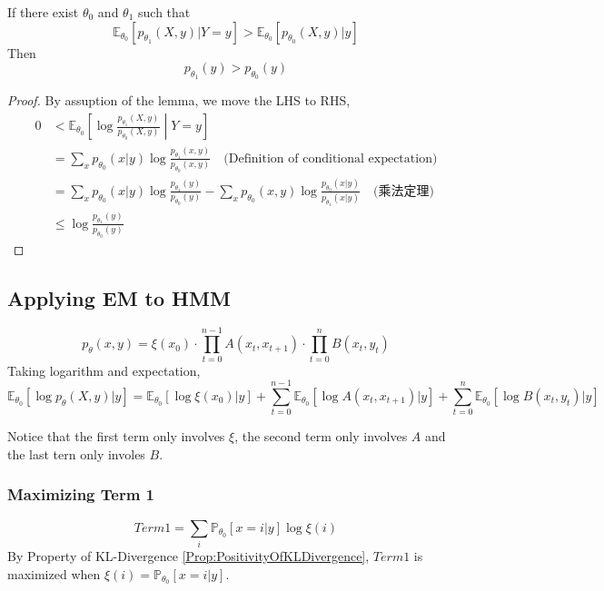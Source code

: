         \begin{lemma}\label{Lem:IncreasingLowerBoundOfEMAlgo}
            If there exist $\theta_0$ and $\theta_1$ such that
            \[ \mathbb{E}_{\theta_0}[p_{\theta_1}(X,y)|Y=y] > \mathbb{E}_{\theta_0}[p_{\theta_0}(X,y)|y] \]
            Then
            \[ p_{\theta_1}(y) > p_{\theta_0}(y) \]
        \end{lemma}
        \begin{proof}
            By assuption of the lemma, we move the LHS to RHS,
            \begin{align*}
                0 &< \mathbb{E}_{\theta_0}\left[ \log \frac{p_{\theta_1}(X,y)}{p_{\theta_0}(X,y)} \middle\vert Y=y \right]\\
                &= \sum_x p_{\theta_0}(x|y) \log \frac{p_{\theta_1}(x,y)}{p_{\theta_0}(x,y)} \quad \text{(Definition of conditional expectation)}\\
                &= \sum_x p_{\theta_0}(x|y) \log \frac{p_{\theta_1}(y)}{p_{\theta_0}(y)} - \sum_x p_{\theta_0}(x,y)\log\frac{p_{\theta_0}(x|y)}{p_{\theta_1}(x|y)} \quad \text{(乘法定理)} \\
                &\le \log\frac{p_{\theta_1}(y)}{p_{\theta_0}(y)}
            \end{align*}
        \end{proof}

    \subsection{Applying EM to HMM}
        \[ p_{\theta}(x,y) = \xi(x_0) \cdot \prod_{t=0}^{n-1}A(x_t,x_{t+1}) \cdot \prod_{t=0}^n B(x_t, y_t) \]
        Taking logarithm and expectation,
        \[ \mathbb{E}_{\theta_0}\left[ \log p_{\theta}(X,y)|y \right] = \mathbb{E}_{\theta_0}[\log\xi(x_0)|y] + \sum_{t=0}^{n-1}\mathbb{E}_{\theta_0}[\log A(x_t,x_{t+1})|y] + \sum_{t=0}^n\mathbb{E}_{\theta_0}[\log B(x_t,y_t)|y] \]

        Notice that the first term only involves $\xi$, the second term only involves $A$ and the last tern only involes $B$.

        \subsubsection{Maximizing Term 1}
        \[ Term1 = \sum_i \mathbb{P}_{\theta_0}[x=i|y]\log\xi(i) \]
        By Property of KL-Divergence \ref{Prop:PositivityOfKLDivergence}, $Term1$ is maximized when $\xi(i) = \mathbb{P}_{\theta_0}[x=i|y]$.


